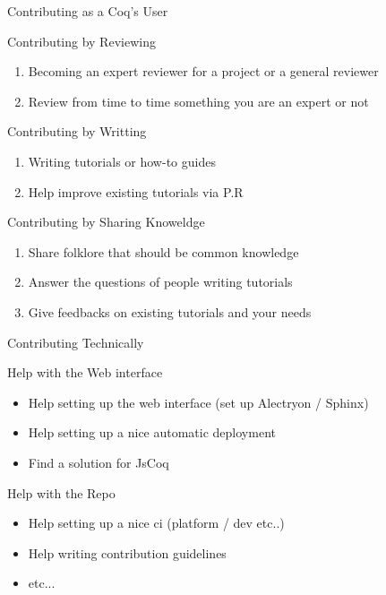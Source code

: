\documentclass[10pt]{beamer}
\begin{document}
\begin{frame}{Contributing as a Coq's User}
  \begin{tcbProp}{Contributing by Reviewing}
    \begin{enumerate}
      \item Becoming an expert reviewer for a project or a general reviewer
      \item Review from time to time something you are an expert or not
    \end{enumerate}
  \end{tcbProp}
  \begin{tcbProp}{Contributing by Writting}
    \begin{enumerate}
      \item Writing tutorials or how-to guides
      \item Help improve existing tutorials via P.R
    \end{enumerate}
  \end{tcbProp}
  \begin{tcbProp}{Contributing by Sharing Knoweldge}
    \begin{enumerate}
      \item Share folklore that should be common knowledge
      \item Answer the questions of people writing tutorials
      \item Give feedbacks on existing tutorials and your needs
    \end{enumerate}
  \end{tcbProp}
\end{frame}


\begin{frame}{Contributing Technically}
  \begin{tcbProp}{Help with the Web interface}
    \begin{itemize}[label=$-$]
      \item Help setting up the web interface (set up Alectryon / Sphinx)
      \item Help setting up a nice automatic deployment
      \item Find a solution for JsCoq
    \end{itemize}
  \end{tcbProp}
  \begin{tcbProp}{Help with the Repo}
    \begin{itemize}[label=$-$]
      \item Help setting up a nice ci (platform / dev etc..)
      \item Help writing contribution guidelines
      \item etc...
    \end{itemize}
  \end{tcbProp}
\end{frame}
\end{document}
